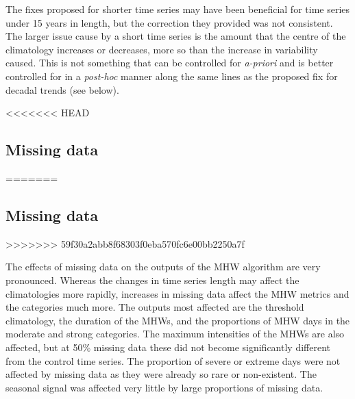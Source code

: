 \documentclass[]{article}
\begin{document}
{The fixes proposed for shorter time series may have been beneficial for
time series under 15 years in length, but the correction they provided
was not consistent. The larger issue cause by a short time series is the
amount that the centre of the climatology increases or decreases, more
so than the increase in variability caused. This is not something that
can be controlled for \emph{a-priori} and is better controlled for in a
\emph{post-hoc} manner along the same lines as the proposed fix for
decadal trends (see below).

<<<<<<< HEAD
\hypertarget{missing-data}{%
\subsection{Missing data}\label{missing-data}}
=======
\subsection{Missing data}\label{missing-data}
>>>>>>> 59f30a2abb8f68303f0eba570fc6e00bb2250a7f

The effects of missing data on the outputs of the MHW algorithm are very
pronounced. Whereas the changes in time series length may affect the
climatologies more rapidly, increases in missing data affect the MHW
metrics and the categories much more. The outputs most affected are the
threshold climatology, the duration of the MHWs, and the proportions of
MHW days in the moderate and strong categories. The maximum intensities
of the MHWs are also affected, but at 50\% missing data these did not
become significantly different from the control time series. The
proportion of severe or extreme days were not affected by missing data
as they were already so rare or non-existent. The seasonal signal was
affected very little by large proportions of missing data.

}
\end{document}

